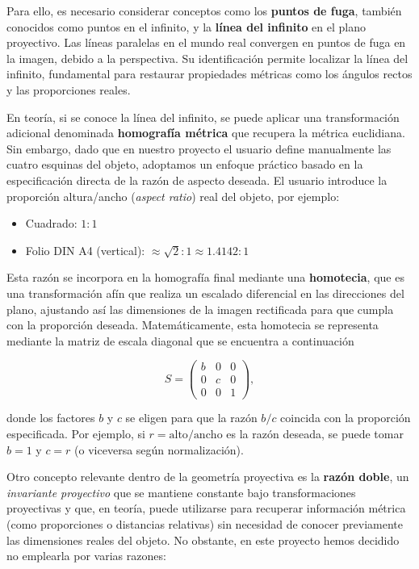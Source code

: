 Para ello, es necesario considerar conceptos como los \textbf{puntos de fuga}, también conocidos como puntos en el infinito, y la \textbf{línea del infinito} en el plano proyectivo. Las líneas paralelas en el mundo real convergen en puntos de fuga en la imagen, debido a la perspectiva. Su identificación permite localizar la línea del infinito, fundamental para restaurar propiedades métricas como los ángulos rectos y las proporciones reales.

En teoría, si se conoce la línea del infinito, se puede aplicar una transformación adicional denominada \textbf{homografía métrica} que recupera la métrica euclidiana. Sin embargo, dado que en nuestro proyecto el usuario define manualmente las cuatro esquinas del objeto, adoptamos un enfoque práctico basado en la especificación directa de la razón de aspecto deseada. El usuario introduce la proporción altura/ancho (\textit{aspect ratio}) real del objeto, por ejemplo:

\begin{itemize}
    \item Cuadrado: \(1:1\)
    \item Folio DIN A4 (vertical): \(\approx \sqrt{2}:1 \approx 1.4142:1\)
\end{itemize}

Esta razón se incorpora en la homografía final mediante una \textbf{homotecia}, que es una transformación afín que realiza un escalado diferencial en las direcciones del plano, ajustando así las dimensiones de la imagen rectificada para que cumpla con la proporción deseada. Matemáticamente, esta homotecia se representa mediante la matriz de escala diagonal que se encuentra a continuación

\[
S = 
\begin{pmatrix}
b & 0 & 0 \\
0 & c & 0 \\
0 & 0 & 1
\end{pmatrix},
\]

donde los factores \(b\) y \(c\) se eligen para que la razón \(b/c\) coincida con la proporción especificada. Por ejemplo, si \(r = \text{alto}/\text{ancho}\) es la razón deseada, se puede tomar \(b=1\) y \(c=r\) (o viceversa según normalización).

Otro concepto relevante dentro de la geometría proyectiva es la \textbf{razón doble}, un \textit{invariante proyectivo} que se mantiene constante bajo transformaciones proyectivas y que, en teoría, puede utilizarse para recuperar información métrica (como proporciones o distancias relativas) sin necesidad de conocer previamente las dimensiones reales del objeto. No obstante, en este proyecto hemos decidido no emplearla por varias razones:

